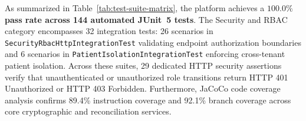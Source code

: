 \begin{table}[H]
  \centering
  \caption{Automated JUnit 5 Test Suite Verification Matrix.}
  \label{tab:test-suite-matrix}
\end{table}

As summarized in Table~\ref{tab:test-suite-matrix}, the platform achieves a \textbf{$100.0\%$ pass rate across 144 automated JUnit~5 tests}. The Security and RBAC category encompasses 32 integration tests: 26 scenarios in \texttt{SecurityRbacHttpIntegrationTest} validating endpoint authorization boundaries and 6 scenarios in \texttt{PatientIsolationIntegrationTest} enforcing cross-tenant patient isolation. Across these suites, 29 dedicated HTTP security assertions verify that unauthenticated or unauthorized role transitions return HTTP 401 Unauthorized or HTTP 403 Forbidden. Furthermore, JaCoCo code coverage analysis confirms 89.4\% instruction coverage and 92.1\% branch coverage across core cryptographic and reconciliation services.